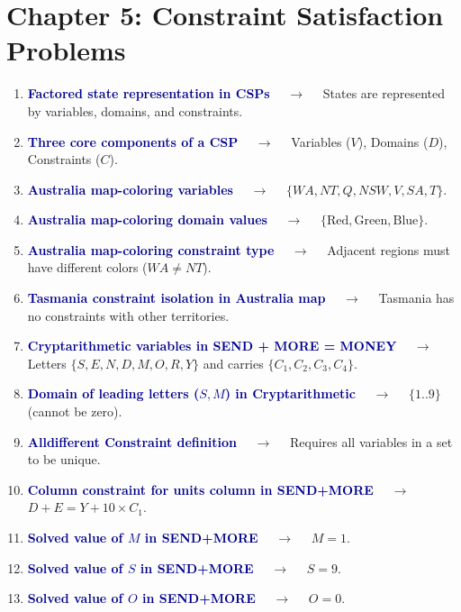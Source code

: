 \documentclass[11pt,a4paper]{article}
\begin{document}
\section*{Chapter 5: Constraint Satisfaction Problems}

\begin{enumerate}[label=\arabic*., leftmargin=*, labelsep=0.8em, itemsep=0.35em, parsep=0.1em, topsep=0.2em]
  \item \textcolor{darkblue}{\textbf{Factored state representation in CSPs}} $\quad\to\quad$ States are represented by variables, domains, and constraints.
  \item \textcolor{darkblue}{\textbf{Three core components of a CSP}} $\quad\to\quad$ Variables ($V$), Domains ($D$), Constraints ($C$).
  \item \textcolor{darkblue}{\textbf{Australia map-coloring variables}} $\quad\to\quad$ $\{WA, NT, Q, NSW, V, SA, T\}$.
  \item \textcolor{darkblue}{\textbf{Australia map-coloring domain values}} $\quad\to\quad$ $\{\text{Red}, \text{Green}, \text{Blue}\}$.
  \item \textcolor{darkblue}{\textbf{Australia map-coloring constraint type}} $\quad\to\quad$ Adjacent regions must have different colors ($WA \ne NT$).
  \item \textcolor{darkblue}{\textbf{Tasmania constraint isolation in Australia map}} $\quad\to\quad$ Tasmania has no constraints with other territories.
  \item \textcolor{darkblue}{\textbf{Cryptarithmetic variables in SEND + MORE = MONEY}} $\quad\to\quad$ Letters $\{S,E,N,D,M,O,R,Y\}$ and carries $\{C_1,C_2,C_3,C_4\}$.
  \item \textcolor{darkblue}{\textbf{Domain of leading letters ($S, M$) in Cryptarithmetic}} $\quad\to\quad$ $\{1..9\}$ (cannot be zero).
  \item \textcolor{darkblue}{\textbf{Alldifferent Constraint definition}} $\quad\to\quad$ Requires all variables in a set to be unique.
  \item \textcolor{darkblue}{\textbf{Column constraint for units column in SEND+MORE}} $\quad\to\quad$ $D + E = Y + 10 \times C_1$.
  \item \textcolor{darkblue}{\textbf{Solved value of $M$ in SEND+MORE}} $\quad\to\quad$ $M = 1$.
  \item \textcolor{darkblue}{\textbf{Solved value of $S$ in SEND+MORE}} $\quad\to\quad$ $S = 9$.
  \item \textcolor{darkblue}{\textbf{Solved value of $O$ in SEND+MORE}} $\quad\to\quad$ $O = 0$.

\end{enumerate}
\end{document}
